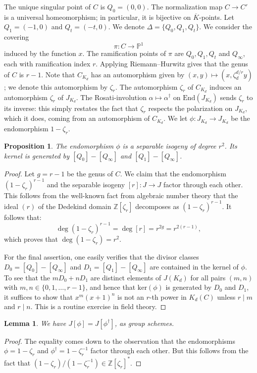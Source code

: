 \documentclass[reqno]{amsart}
\newtheorem{lemma}[thm]{Lemma}
\newtheorem{proposition}[thm]{Proposition}
\theoremstyle{definition}
\theoremstyle{remark}
\def\p{\mathbb{P}}
\def\Z{\mathbb{Z}}
\def \End{\mathrm{End}}
\def\ker{\text{ker}}
\begin{document}
The unique singular point of $C$ is $Q_0 = (0,0)$. The normalization map $C \rightarrow C'$ is a universal homeomorphism; in particular, it is bijective on $\overline{K}$-points. Let $Q_1 = (-1,0)$ and $Q_t = (-t,0)$. We denote $\Delta = \{Q_0,Q_1,Q_t\}$. We consider the covering
$$
\pi : C \rightarrow \p^1
$$
induced by the function $x$. The ramification points of $\pi$ are $Q_0,Q_1,Q_t$ and $Q_{\infty}$, each with ramification index $r$. Applying Riemann--Hurwitz gives that the genus of $C$ is $r - 1$. Note that $C_{K_d}$ has an automorphism given by $(x,y) \mapsto (x,\zeta_d^{d/r} y)$; we denote this automorphism by $\zeta_r$. The automorphism $\zeta_r$ of $C_{K_d}$ induces an automorphism $\zeta_r$ of $J_{K_d}$. The Rosati-involution $\alpha \mapsto \alpha^{\dagger}$ on $\End(J_{K_d})$ sends $\zeta_r$ to its inverse: this simply restates the fact that $\zeta_r$ respects the polarization on $J_{K_d}$, which it does, coming from an automorphism of $C_{K_d}$. We let $\phi : J_{K_d} \rightarrow J_{K_d}$ be the endomorphism $1 - \zeta_r$.

\begin{proposition}
\label{propertiesOfPhi}
The endomorphism $\phi$ is a separable isogeny of degree $r^2$. Its kernel is generated by $[Q_0] - [Q_{\infty}]$ and $[Q_1] - [Q_{\infty}]$.
\end{proposition}
\begin{proof}
Let $g = r-1$ be the genus of $C$. We claim that the endomorphism $(1-\zeta_r)^{r-1}$ and the separable isogeny $[r]:J\rightarrow J$ factor through each other. This follows from the well-known fact from algebraic number theory that the ideal $(r)$ of the Dedekind domain $\Z[\zeta_r]$ decomposes as $(1-\zeta_r)^{r-1}$. It follows that:
$$
\deg(1-\zeta_r)^{r-1} = \deg {[r]} =  r^{2g} = r^{2(r-1)},
$$
which proves that $\deg(1-\zeta_r) = r^2$.

For the final assertion, one easily verifies that the divisor classes $D_0 = [Q_0] - [Q_{\infty}]$ and $D_1 = [Q_1] - [Q_{\infty}]$ are contained in the kernel of $\phi$. To see that the $mD_0 + nD_1$ are distinct elements of $J(K_d)$ for all pairs $(m,n)$ with $m,n \in \{0,1,\ldots,r-1\}$, and hence that $\ker(\phi)$ is generated by $D_0$ and $D_1$, it suffices to show that $x^m(x+1)^n$ is not an $r$-th power in $K_d(C)$ unless $r \mid m$ and $r \mid n$. This is a routine exercise in field theory. 
\end{proof}

\begin{lemma}
\label{rosati}
We have $J[\phi] = J[\phi^{\dagger}]$, as group schemes.
\end{lemma}
\begin{proof}
The equality comes down to the observation that the endomorphisms $\phi = 1-\zeta_r$ and $\phi^\dagger = 1-\zeta_r^{-1}$ factor through each other. But this follows from the fact that $(1-\zeta_r)/(1-\zeta_r^{-1}) \in \Z[\zeta_r]^{\ast}$.
\end{proof}
\end{document}
